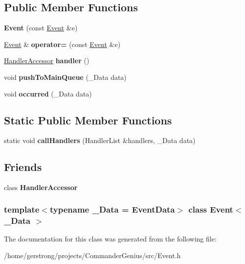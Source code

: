 \subsection*{Public Member Functions}
\begin{DoxyCompactItemize}
\item 
\hypertarget{class_event_accc31537f1b88619af8b35954ea3d5c9}{
{\bfseries Event} (const \hyperlink{class_event}{Event} \&e)}
\label{class_event_accc31537f1b88619af8b35954ea3d5c9}

\item 
\hypertarget{class_event_a51ba6ecf54d0c3be2c8b66ad9a3ee428}{
\hyperlink{class_event}{Event} \& {\bfseries operator=} (const \hyperlink{class_event}{Event} \&e)}
\label{class_event_a51ba6ecf54d0c3be2c8b66ad9a3ee428}

\item 
\hypertarget{class_event_af6e9119db3fba94b5da6ee7fa1f00883}{
\hyperlink{class_event_1_1_handler_accessor}{HandlerAccessor} {\bfseries handler} ()}
\label{class_event_af6e9119db3fba94b5da6ee7fa1f00883}

\item 
\hypertarget{class_event_aa34e9bc14af7ec9f1b73dbbfdc5efbdf}{
void {\bfseries pushToMainQueue} (\_\-Data data)}
\label{class_event_aa34e9bc14af7ec9f1b73dbbfdc5efbdf}

\item 
\hypertarget{class_event_a843da2e83c68446c2087b1853a4ee00f}{
void {\bfseries occurred} (\_\-Data data)}
\label{class_event_a843da2e83c68446c2087b1853a4ee00f}

\end{DoxyCompactItemize}
\subsection*{Static Public Member Functions}
\begin{DoxyCompactItemize}
\item 
\hypertarget{class_event_a1d4c343cfe3fa7e7507836b1f9a47f0f}{
static void {\bfseries callHandlers} (HandlerList \&handlers, \_\-Data data)}
\label{class_event_a1d4c343cfe3fa7e7507836b1f9a47f0f}

\end{DoxyCompactItemize}
\subsection*{Friends}
\begin{DoxyCompactItemize}
\item 
\hypertarget{class_event_a6d0e79cf1d265bda2125228d1c7bb4f8}{
class {\bfseries HandlerAccessor}}
\label{class_event_a6d0e79cf1d265bda2125228d1c7bb4f8}

\end{DoxyCompactItemize}
\subsubsection*{template$<$typename \_\-Data = EventData$>$ class Event$<$ \_\-Data $>$}



The documentation for this class was generated from the following file:\begin{DoxyCompactItemize}
\item 
/home/gerstrong/projects/CommanderGenius/src/Event.h\end{DoxyCompactItemize}
